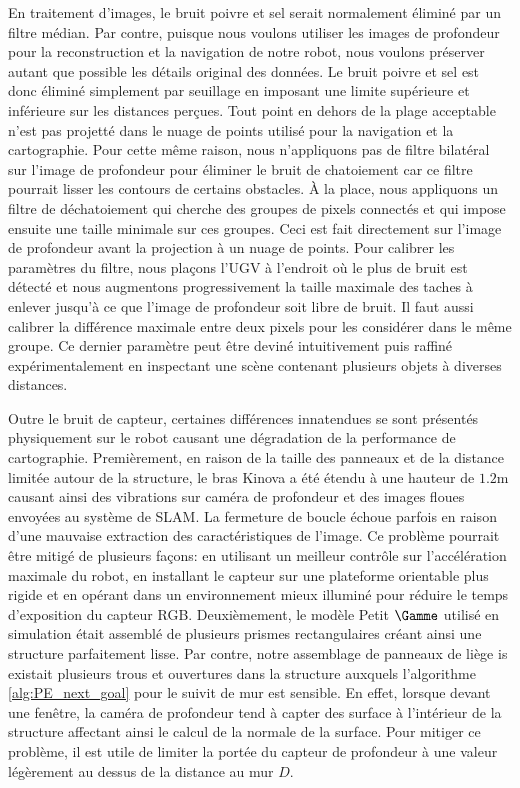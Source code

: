 En traitement d'images, le bruit poivre et sel serait normalement éliminé par un filtre médian. Par contre, puisque nous voulons utiliser les images de profondeur pour la reconstruction et la navigation de notre robot, nous voulons préserver autant que possible les détails original des données. Le bruit poivre et sel est donc éliminé simplement par seuillage en imposant une limite supérieure et inférieure sur les distances perçues. Tout point en dehors de la plage acceptable n'est pas projetté dans le nuage de points utilisé pour la navigation et la cartographie. Pour cette même raison, nous n'appliquons pas de filtre bilatéral sur l'image de profondeur pour éliminer le bruit de chatoiement car ce filtre pourrait lisser les contours de certains obstacles. À la place, nous appliquons un filtre de déchatoiement qui cherche des groupes de pixels connectés et qui impose ensuite une taille minimale sur ces groupes. Ceci est fait directement sur l'image de profondeur avant la projection à un nuage de points. Pour calibrer les paramètres du filtre, nous plaçons l'UGV à l'endroit où le plus de bruit est détecté et nous augmentons progressivement la taille maximale des taches à enlever jusqu'à ce que l'image de profondeur soit libre de bruit. Il faut aussi calibrer la différence maximale entre deux pixels pour les considérer dans le même groupe. Ce dernier paramètre peut être deviné intuitivement puis raffiné expérimentalement en inspectant une scène contenant plusieurs objets à diverses distances.

Outre le bruit de capteur, certaines différences innatendues se sont présentés physiquement sur le robot causant une dégradation de la performance de cartographie. Premièrement, en raison de la taille des panneaux et de la distance limitée autour de la structure, le bras Kinova a été étendu à une hauteur de $1.2$m causant ainsi des vibrations sur caméra de profondeur et des images floues envoyées au système de SLAM. La fermeture de boucle échoue parfois en raison d'une mauvaise extraction des caractéristiques de l'image. Ce problème pourrait être mitigé de plusieurs façons: en utilisant un meilleur contrôle sur l'accélération maximale du robot, en installant le capteur sur une plateforme orientable plus rigide et en opérant dans un environnement mieux illuminé pour réduire le temps d'exposition du capteur RGB. Deuxièmement, le modèle Petit $\Gamme$ utilisé en simulation était assemblé de plusieurs prismes rectangulaires créant ainsi une structure parfaitement lisse. Par contre, notre assemblage de panneaux de liège is existait plusieurs trous et ouvertures dans la structure auxquels l'algorithme \ref{alg:PE_next_goal} pour le suivit de mur est sensible. En effet, lorsque devant une fenêtre, la caméra de profondeur tend à capter des surface à l'intérieur de la structure affectant ainsi le calcul de la normale de la surface. Pour mitiger ce problème, il est utile de limiter la portée du capteur de profondeur à une valeur légèrement au dessus de la distance au mur $D$.

